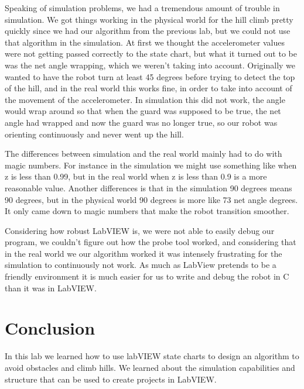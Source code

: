 \documentclass[10pt,titlepage]{article}
\begin{document}
    Speaking of simulation problems, we had a tremendous amount of trouble in simulation. We got things working in the physical world for the hill climb pretty quickly since we had our algorithm from the previous lab, but we could not use that algorithm in the simulation. At first we thought the accelerometer values were not getting passed correctly to the state chart, but what it turned out to be was the net angle wrapping, which we weren't taking into account. Originally we wanted to have the robot turn at least 45 degrees before trying to detect the top of the hill, and in the real world this works fine, in order to take into account of the movement of the accelerometer. In simulation this did not work, the angle would wrap around so that when the guard was supposed to be true, the net angle had wrapped and now the guard was no longer true, so our robot was orienting continuously and never went up the hill.

    The differences between simulation and the real world mainly had to do with magic numbers. For instance in the simulation we might use something like when z is less than 0.99, but in the real world when z is less than 0.9 is a more reasonable value. Another differences is that in the simulation 90 degrees means 90 degrees, but in the physical world 90 degrees is more like 73 net angle degrees. It only came down to magic numbers that make the robot transition smoother.

    Considering how robust LabVIEW is, we were not able to easily debug our program, we couldn't figure out how the probe tool worked, and considering that in the real world we our algorithm worked it was intensely frustrating for the simulation to continuously not work. As much as LabView pretends to be a friendly environment it is much easier for us to write and debug the robot in C than it was in LabVIEW.

  \section{Conclusion}
    In this lab we learned how to use labVIEW state charts to design an algorithm to avoid obstacles and climb hills. We learned about the simulation capabilities and structure that can be used to create projects in LabVIEW. 
\end{document}
